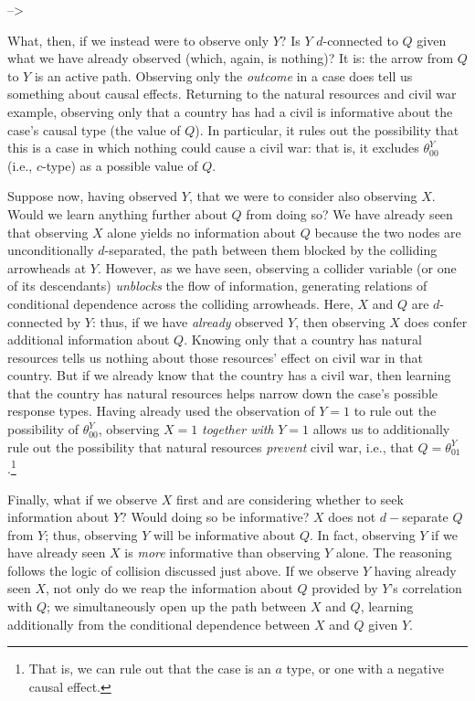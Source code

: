 \documentclass[
  12pt,
]{book}
\begin{document}
--\textgreater{}

What, then, if we instead were to observe only \(Y\)? Is \(Y\) \(d\)-connected to \(Q\) given what we have already observed (which, again, is nothing)? It is: the arrow from \(Q\) to \(Y\) is an active path. Observing only the \emph{outcome} in a case does tell us something about causal effects. Returning to the natural resources and civil war example, observing only that a country has had a civil is informative about the case's causal type (the value of \(Q\)). In particular, it rules out the possibility that this is a case in which nothing could cause a civil war: that is, it excludes \(\theta^Y_{00}\) (i.e., \(c\)-type) as a possible value of \(Q\).

Suppose now, having observed \(Y\), that we were to consider also observing \(X\). Would we learn anything further about \(Q\) from doing so? We have already seen that observing \(X\) alone yields no information about \(Q\) because the two nodes are unconditionally \(d\)-separated, the path between them blocked by the colliding arrowheads at \(Y\). However, as we have seen, observing a collider variable (or one of its descendants) \emph{unblocks} the flow of information, generating relations of conditional dependence across the colliding arrowheads. Here, \(X\) and \(Q\) are \(d\)-connected by \(Y\): thus, if we have \emph{already} observed \(Y\), then observing \(X\) does confer additional information about \(Q\). Knowing only that a country has natural resources tells us nothing about those resources' effect on civil war in that country. But if we already know that the country has a civil war, then learning that the country has natural resources helps narrow down the case's possible response types. Having already used the observation of \(Y=1\) to rule out the possibility of \(\theta^Y_{00}\), observing \(X=1\) \emph{together with} \(Y=1\) allows us to additionally rule out the possibility that natural resources \emph{prevent} civil war, i.e., that \(Q=\theta^Y_{01}\).\footnote{That is, we can rule out that the case is an \(a\) type, or one with a negative causal effect.}

Finally, what if we observe \(X\) first and are considering whether to seek information about \(Y\)? Would doing so be informative? \(X\) does not \(d-\)separate \(Q\) from \(Y\); thus, observing \(Y\) will be informative about \(Q\). In fact, observing \(Y\) if we have already seen \(X\) is \emph{more} informative than observing \(Y\) alone. The reasoning follows the logic of collision discussed just above. If we observe \(Y\) having already seen \(X\), not only do we reap the information about \(Q\) provided by \(Y\)'s correlation with \(Q\); we simultaneously open up the path between \(X\) and \(Q\), learning additionally from the conditional dependence between \(X\) and \(Q\) given \(Y\).
\end{document}
